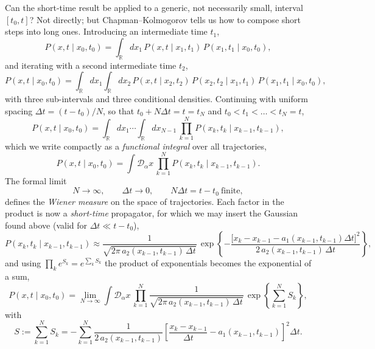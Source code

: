 Can the short-time result be applied to a generic, not necessarily small, interval $[t_0,t]$?
Not directly; but Chapman--Kolmogorov tells us how to compose short steps into long ones.
Introducing an intermediate time $t_1$,
\begin{equation}
P(x,t\mid x_0,t_0) = \int_{\mathbb{R}} dx_1\, P(x,t\mid x_1,t_1)\,P(x_1,t_1\mid x_0,t_0),
\end{equation}
and iterating with a second intermediate time $t_2$,
\begin{equation}
P(x,t\mid x_0,t_0) = \int_{\mathbb{R}} dx_1\int_{\mathbb{R}} dx_2\, P(x,t\mid x_2,t_2)\,P(x_2,t_2\mid x_1,t_1)\,P(x_1,t_1\mid x_0,t_0),
\end{equation}
with three sub-intervals and three conditional densities.
Continuing with uniform spacing $\Delta t=(t-t_0)/N$, so that $t_0+N\Delta t = t = t_N$ and $t_0<t_1<\dots<t_N=t$,
\begin{equation}
P(x,t\mid x_0,t_0) = \int_{\mathbb{R}} dx_1\cdots\int_{\mathbb{R}} dx_{N-1}\, \prod_{k=1}^{N} P(x_k,t_k\mid x_{k-1},t_{k-1}),
\end{equation}
which we write compactly as a \emph{functional integral} over all trajectories,
\begin{equation}
P(x,t\mid x_0,t_0) = \int \mathcal{D}_\alpha x\, \prod_{k=1}^{N} P(x_k,t_k\mid x_{k-1},t_{k-1}).
\end{equation}
The formal limit
\begin{equation}
N\to\infty,\qquad \Delta t\to0,\qquad N\Delta t = t-t_0\ \text{finite},
\end{equation}
defines the \emph{Wiener measure} on the space of trajectories.
Each factor in the product is now a \emph{short-time} propagator, for which we may insert the Gaussian found above (valid for $\Delta t\ll t-t_0$),
\begin{equation}
P(x_k,t_k\mid x_{k-1},t_{k-1}) \approx \frac{1}{\sqrt{2\pi\,a_2(x_{k-1},t_{k-1})\,\Delta t}}\,\exp\!\left\{-\frac{\big[x_k-x_{k-1}-a_1(x_{k-1},t_{k-1})\Delta t\big]^2}{2\,a_2(x_{k-1},t_{k-1})\,\Delta t}\right\},
\end{equation}
and using $\prod_k e^{S_k}=e^{\sum_k S_k}$ the product of exponentials becomes the exponential of a sum,
\begin{equation}
P(x,t\mid x_0,t_0) = \lim_{N\to\infty}\int \mathcal{D}_\alpha x\, \prod_{k=1}^{N}\frac{1}{\sqrt{2\pi\,a_2(x_{k-1},t_{k-1})\,\Delta t}}\,\exp\!\left\{\sum_{k=1}^{N} S_k\right\},
\end{equation}
with
\begin{equation}
S := \sum_{k=1}^{N} S_k = -\sum_{k=1}^{N}\frac{1}{2\,a_2(x_{k-1},t_{k-1})}\left[\frac{x_k-x_{k-1}}{\Delta t}-a_1(x_{k-1},t_{k-1})\right]^2\Delta t.
\end{equation}
